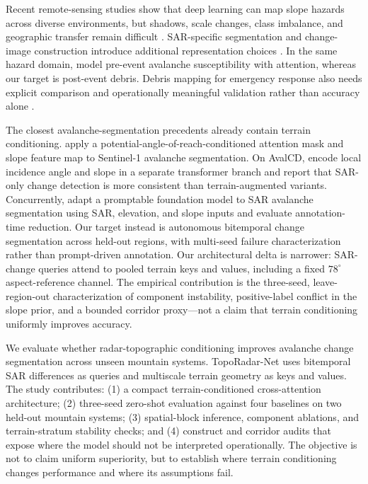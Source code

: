\documentclass[referee,lineno,pdflatex,sn-apa]{sn-jnl}
\begin{document}
Recent remote-sensing studies show that deep learning can map slope hazards across diverse environments, but shadows, scale changes, class imbalance, and geographic transfer remain difficult \citep{nguyen2025landslide,chandra2025landslide}. SAR-specific segmentation and change-image construction introduce additional representation choices \citep{arjasakusuma2024sar,wang2025change}. In the same hazard domain, \citet{ahmad2026avalanche} model pre-event avalanche susceptibility with attention, whereas our target is post-event debris. Debris mapping for emergency response also needs explicit comparison and operationally meaningful validation rather than accuracy alone \citep{bayat2026debris}.

The closest avalanche-segmentation precedents already contain terrain conditioning. \citet{bianchi2021snow} apply a potential-angle-of-reach-conditioned attention mask and slope feature map to Sentinel-1 avalanche segmentation. On AvalCD, \citet{gatti2026avalanche} encode local incidence angle and slope in a separate transformer branch and report that SAR-only change detection is more consistent than terrain-augmented variants. Concurrently, \citet{gelato2026promptable} adapt a promptable foundation model to SAR avalanche segmentation using SAR, elevation, and slope inputs and evaluate annotation-time reduction. Our target instead is autonomous bitemporal change segmentation across held-out regions, with multi-seed failure characterization rather than prompt-driven annotation. Our architectural delta is narrower: SAR-change queries attend to pooled terrain keys and values, including a fixed $78^\circ$ aspect-reference channel. The empirical contribution is the three-seed, leave-region-out characterization of component instability, positive-label conflict in the slope prior, and a bounded corridor proxy---not a claim that terrain conditioning uniformly improves accuracy.

We evaluate whether radar-topographic conditioning improves avalanche change segmentation across unseen mountain systems. TopoRadar-Net uses bitemporal SAR differences as queries and multiscale terrain geometry as keys and values. The study contributes: (1) a compact terrain-conditioned cross-attention architecture; (2) three-seed zero-shot evaluation against four baselines on two held-out mountain systems; (3) spatial-block inference, component ablations, and terrain-stratum stability checks; and (4) construct and corridor audits that expose where the model should not be interpreted operationally. The objective is not to claim uniform superiority, but to establish where terrain conditioning changes performance and where its assumptions fail.
\end{document}
